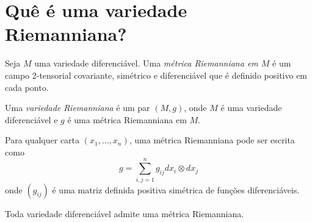 
\cite{Lee2012}
\cite{Lee1997}
\cite{Lee1997a}
\cite{Lee1997b}



\section{Quê é uma variedade Riemanniana?}

\begin{definicao}
	Seja $M$ uma variedade diferenciável. Uma \emph{métrica Riemanniana em $M$} é um campo 2-tensorial covariante, simétrico e diferenciável que é definido positivo em cada ponto.	
\end{definicao}

\begin{definicao}
	Uma \emph{variedade Riemanniana} é um par $(M,g)$, onde $M$ é uma variedade diferenciável e $g$ é uma métrica Riemanniana em $M$.
\end{definicao}

\begin{observacao}
	Para qualquer carta $(x_1, \ldots, x_n)$, uma métrica Riemanniana pode ser escrita como
	\begin{equation*}
		g = \sum_{i,j=1}^n g_{ij} dx_i \otimes dx_j
	\end{equation*}
	onde $(g_{ij})$ é uma matriz definida positiva simétrica de funções diferenciáveis.
\end{observacao}

\begin{proposicao}
Toda variedade diferenciável admite uma métrica Riemanniana.
\end{proposicao}


